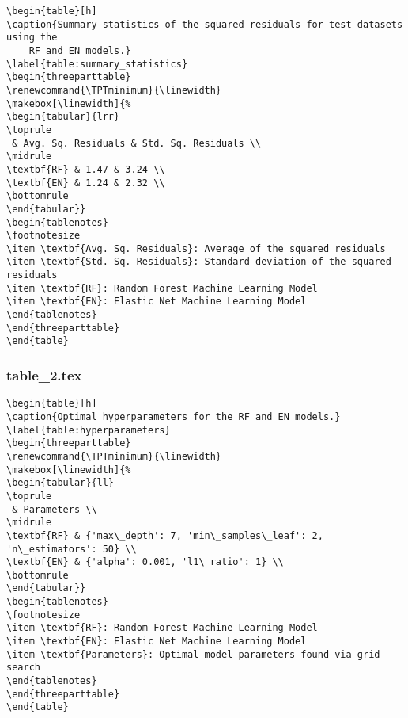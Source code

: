 \documentclass[11pt]{article}
\begin{document}
\begin{Verbatim}[tabsize=4]
\begin{table}[h]
\caption{Summary statistics of the squared residuals for test datasets using the
	RF and EN models.}
\label{table:summary_statistics}
\begin{threeparttable}
\renewcommand{\TPTminimum}{\linewidth}
\makebox[\linewidth]{%
\begin{tabular}{lrr}
\toprule
 & Avg. Sq. Residuals & Std. Sq. Residuals \\
\midrule
\textbf{RF} & 1.47 & 3.24 \\
\textbf{EN} & 1.24 & 2.32 \\
\bottomrule
\end{tabular}}
\begin{tablenotes}
\footnotesize
\item \textbf{Avg. Sq. Residuals}: Average of the squared residuals
\item \textbf{Std. Sq. Residuals}: Standard deviation of the squared residuals
\item \textbf{RF}: Random Forest Machine Learning Model
\item \textbf{EN}: Elastic Net Machine Learning Model
\end{tablenotes}
\end{threeparttable}
\end{table}

\end{Verbatim}

\subsubsection*{table\_2.tex}

\begin{Verbatim}[tabsize=4]
\begin{table}[h]
\caption{Optimal hyperparameters for the RF and EN models.}
\label{table:hyperparameters}
\begin{threeparttable}
\renewcommand{\TPTminimum}{\linewidth}
\makebox[\linewidth]{%
\begin{tabular}{ll}
\toprule
 & Parameters \\
\midrule
\textbf{RF} & {'max\_depth': 7, 'min\_samples\_leaf': 2, 'n\_estimators': 50} \\
\textbf{EN} & {'alpha': 0.001, 'l1\_ratio': 1} \\
\bottomrule
\end{tabular}}
\begin{tablenotes}
\footnotesize
\item \textbf{RF}: Random Forest Machine Learning Model
\item \textbf{EN}: Elastic Net Machine Learning Model
\item \textbf{Parameters}: Optimal model parameters found via grid search
\end{tablenotes}
\end{threeparttable}
\end{table}

\end{Verbatim}
\end{document}
